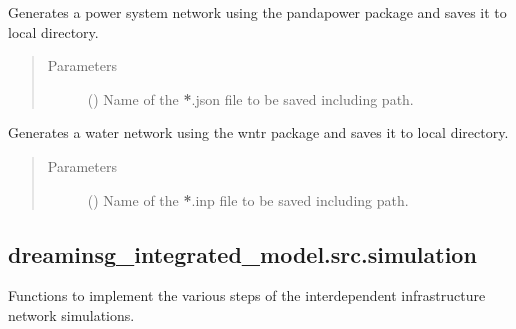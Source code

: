 \documentclass[letterpaper,10pt,english]{sphinxmanual}
\begin{document}
\begin{fulllineitems}
\label{\detokenize{apidoc:dreaminsg_integrated_model.src.network_generator.generate_powern}}
\sphinxAtStartPar
Generates a power system network using the pandapower package and saves it to local directory.
\begin{quote}\begin{description}
\item[{Parameters}] \leavevmode
\sphinxAtStartPar
{} () \textendash{} Name of the {\color{red}\bfseries{}*}.json file to be saved including path.

\end{description}\end{quote}

\end{fulllineitems}


\begin{fulllineitems}
\label{\detokenize{apidoc:dreaminsg_integrated_model.src.network_generator.generate_watern}}
\sphinxAtStartPar
Generates a water network using the wntr package and saves it to local directory.
\begin{quote}\begin{description}
\item[{Parameters}] \leavevmode
\sphinxAtStartPar
{} () \textendash{} Name of the {\color{red}\bfseries{}*}.inp file to be saved including path.

\end{description}\end{quote}

\end{fulllineitems}



\subsection{dreaminsg\_integrated\_model.src.simulation}
\label{\detokenize{apidoc:module-dreaminsg_integrated_model.src.simulation}}\label{\detokenize{apidoc:dreaminsg-integrated-model-src-simulation}}
\sphinxAtStartPar
Functions to implement the various steps of the interdependent infrastructure network simulations.
\end{document}
